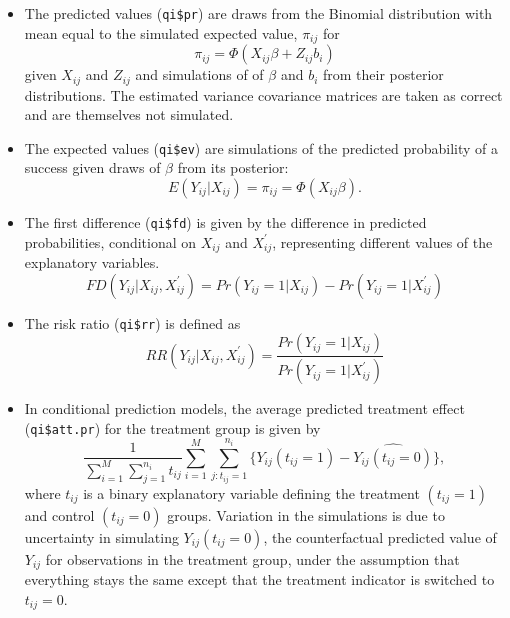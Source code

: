 \begin{itemize}
\item The predicted values ({\tt qi\$pr}) are draws from the Binomial distribution with mean equal to the simulated expected value, $\pi_{ij}$ for
\begin{equation*}
\pi_{ij} = \Phi(X_{ij} \beta + Z_{ij} b_i)
\end{equation*}
given $X_{ij}$ and $Z_{ij}$ and simulations of of $\beta$ and $b_i$ from their posterior distributions. The estimated variance covariance matrices are taken as correct and are themselves not simulated.

\item The expected values ({\tt qi\$ev}) are simulations of the predicted probability of a success given draws of $\beta$ from its posterior:
\begin{equation*}
E(Y_{ij} | X_{ij}) = \pi_{ij} = \Phi(X_{ij} \beta).
\end{equation*}

\item The first difference ({\tt qi\$fd}) is given by the difference in predicted probabilities, conditional on $X_{ij}$ and $X_{ij}^\prime$, representing different values of the explanatory variables.
\begin{equation*}
FD(Y_{ij} | X_{ij}, X_{ij}^\prime) = Pr(Y_{ij} = 1 | X_{ij}) - Pr(Y_{ij} = 1 | X_{ij}^\prime)
\end{equation*}

\item The risk ratio ({\tt qi\$rr}) is defined as
\begin{equation*}
RR(Y_{ij} | X_{ij}, X_{ij}^{\prime}) = \frac{Pr(Y_{ij} = 1 | X_{ij})}{Pr(Y_{ij} = 1 | X_{ij}^{\prime})}
\end{equation*}

\item In conditional prediction models, the average predicted treatment effect ({\tt qi\$att.pr}) for the treatment group is given by
\begin{equation*}
\frac{1}{\sum_{i = 1}^M \sum_{j = 1}^{n_i} t_{ij}} \sum_{i = 1}^M \sum_{j:t_{ij} = 1}^{n_i} \{ Y_{ij} (t_{ij} = 1) - \widehat{Y_{ij}(t_{ij} = 0)} \},
\end{equation*}
where $t_{ij}$ is a binary explanatory variable defining the treatment $(t_{ij} = 1)$ and control $(t_{ij} = 0)$ groups. Variation in the simulations is due to uncertainty in simulating $Y_{ij}(t_{ij} = 0)$, the counterfactual predicted value of $Y_{ij}$ for observations in the treatment group, under the assumption that everything stays the same except that the treatment indicator is switched to $t_{ij} = 0$.


\end{itemize}
